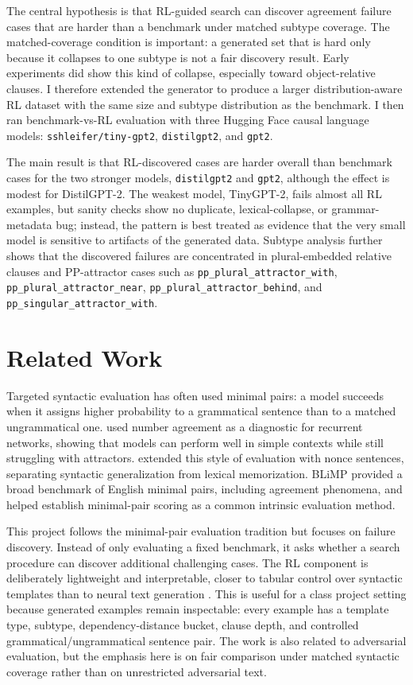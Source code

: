 \documentclass[11pt]{article}
\begin{document}
The central hypothesis is that RL-guided search can discover agreement failure
cases that are harder than a benchmark under matched subtype coverage. The
matched-coverage condition is important: a generated set that is hard only
because it collapses to one subtype is not a fair discovery result. Early
experiments did show this kind of collapse, especially toward object-relative
clauses. I therefore extended the generator to produce a larger
distribution-aware RL dataset with the same size and subtype distribution as
the benchmark. I then ran benchmark-vs-RL evaluation with three Hugging Face
causal language models: \texttt{sshleifer/tiny-gpt2}, \texttt{distilgpt2},
and \texttt{gpt2}.

The main result is that RL-discovered cases are harder overall than benchmark
cases for the two stronger models, \texttt{distilgpt2} and \texttt{gpt2},
although the effect is modest for DistilGPT-2. The weakest model,
TinyGPT-2, fails almost all RL examples, but sanity checks show no duplicate,
lexical-collapse, or grammar-metadata bug; instead, the pattern is best treated
as evidence that the very small model is sensitive to artifacts of the
generated data. Subtype analysis further shows that the discovered failures
are concentrated in plural-embedded relative clauses and PP-attractor cases
such as \texttt{pp\_plural\_attractor\_with},
\texttt{pp\_plural\_attractor\_near},
\texttt{pp\_plural\_attractor\_behind}, and
\texttt{pp\_singular\_attractor\_with}.

\section{Related Work}

Targeted syntactic evaluation has often used minimal pairs: a model succeeds
when it assigns higher probability to a grammatical sentence than to a matched
ungrammatical one. \citet{linzen2016assessing} used number agreement as a
diagnostic for recurrent networks, showing that models can perform well in
simple contexts while still struggling with attractors. \citet{gulordava2018colorless}
extended this style of evaluation with nonce sentences, separating syntactic
generalization from lexical memorization. BLiMP \citep{warstadt2020blimp}
provided a broad benchmark of English minimal pairs, including agreement
phenomena, and helped establish minimal-pair scoring as a common intrinsic
evaluation method.

This project follows the minimal-pair evaluation tradition but focuses on
failure discovery. Instead of only evaluating a fixed benchmark, it asks
whether a search procedure can discover additional challenging cases. The RL component
is deliberately lightweight and interpretable, closer to tabular control over
syntactic templates than to neural text generation \citep{sutton2018reinforcement}.
This is useful for a class
project setting because generated examples remain inspectable: every example
has a template type, subtype, dependency-distance bucket, clause depth, and
controlled grammatical/ungrammatical sentence pair. The work is also related
to adversarial evaluation, but the emphasis here is on fair comparison under
matched syntactic coverage rather than on unrestricted adversarial text.
\end{document}
